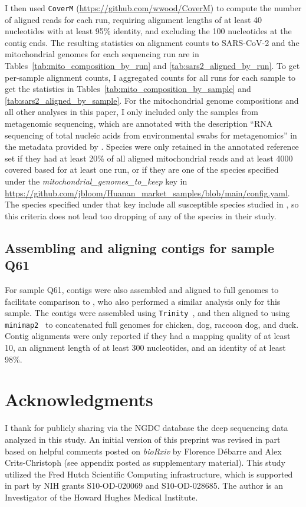 \documentclass[9pt,twocolumn,twoside]{gsajnl_modified}
\begin{document}
{I then used \texttt{CoverM} (\url{https://github.com/wwood/CoverM}) to compute the number of aligned reads for each run, requiring alignment lengths of at least 40 nucleotides with at least 95\% identity, and excluding the 100 nucleotides at the contig ends.
The resulting statistics on alignment counts to SARS-CoV-2 and the mitochondrial genomes for each sequencing run are in Tables~\ref{tab:mito_composition_by_run} and \ref{tab:sars2_aligned_by_run}.
To get per-sample alignment counts, I aggregated counts for all runs for each sample to get the statistics in Tables~\ref{tab:mito_composition_by_sample} and \ref{tab:sars2_aligned_by_sample}.
For the mitochondrial genome compositions and all other analyses in this paper, I only included only the samples from metagenomic sequencing, which are annotated with the description ``RNA sequencing of total nucleic acids from environmental swabs for metagenomics'' in the metadata provided by \citet{liu2023surveillance}.
Species were only retained in the annotated reference set if they had at least 20\% of all aligned mitochondrial reads and at least 4000 covered based for at least one run, or if they are one of the species specified under the \textit{mitochondrial\_genomes\_to\_keep} key in \url{https://github.com/jbloom/Huanan_market_samples/blob/main/config.yaml}.
The species specified under that key include all susceptible species studied in \citet{crits2023genetic}, so this criteria does not lead too dropping of any of the species in their study.

\subsection{Assembling and aligning contigs for sample Q61}
For sample Q61, contigs were also assembled and aligned to full genomes to facilitate comparison to \citet{crits2023genetic}, who also performed a similar analysis only for this sample.
The contigs were assembled using \texttt{Trinity}~\citep{grabherr2011trinity}, and then aligned to using \texttt{minimap2}~\citep{li2018minimap2} to concatenated full genomes for chicken, dog, raccoon dog, and duck.
Contig alignments were only reported if they had a mapping quality of at least 10, an alignment length of at least 300 nucleotides, and an identity of at least 98\%.

\section{Acknowledgments}
I thank \citet{liu2023surveillance} for publicly sharing via the NGDC database the deep sequencing data analyzed in this study.
An initial version of this preprint was revised in part based on helpful comments posted on \textit{bioRxiv} by Florence Débarre and Alex Crits-Christoph (see appendix posted as supplementary material).
This study utilized the Fred Hutch Scientific Computing infrastructure, which is supported in part by NIH grants S10-OD-020069 and S10-OD-028685.
The author is an Investigator of the Howard Hughes Medical Institute.

}
\end{document}
